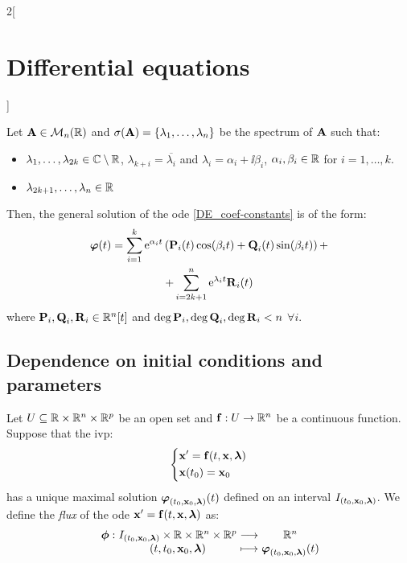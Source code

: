 \documentclass[../../../main.tex]{subfiles}
\begin{document}
\begin{multicols}{2}[\section{Differential equations}]
\begin{corollary}
    Let $\boldsymbol{\mathrm{A}}\in\mathcal{M}_n(\mathbb{R})$ and $\sigma(\boldsymbol{\mathrm{A}})=\{\lambda_1,\ldots,\lambda_n\}$ be the spectrum of $\boldsymbol{\mathrm{A}}$ such that:
    \begin{itemize}
      \item $\lambda_1,\ldots,\lambda_{2k}\in\mathbb{C}\setminus\mathbb{R}$, $\lambda_{k+i}=\overline{\lambda_i}$ and $\lambda_i=\alpha_i+\ii\beta_i$, $\alpha_i,\beta_i\in\mathbb{R}$ for $i=1,\ldots,k$.
      \item $\lambda_{2k+1},\ldots,\lambda_n\in\mathbb{R}$
    \end{itemize}
    Then, the general solution of the ode \eqref{DE_coef-constants} is of the form:
    \begin{multline*}
      \boldsymbol{\mathrm{\varphi}}(t)=\sum_{i=1}^k\mathrm{e}^{\alpha_i t}\left(\boldsymbol{\mathrm{P}}_i(t)\cos(\beta_i t)+\boldsymbol{\mathrm{Q}}_i(t)\sin(\beta_i t)\right)+\\+\sum_{i=2k+1}^n\mathrm{e}^{\lambda_i t}\boldsymbol{\mathrm{R}}_i(t)
    \end{multline*}
    where $\boldsymbol{\mathrm{P}}_i,\boldsymbol{\mathrm{Q}}_i,\boldsymbol{\mathrm{R}}_i\in\mathbb{R}^n[t]$ and $\deg \boldsymbol{\mathrm{P}}_i,\deg\boldsymbol{\mathrm{Q}}_i,\deg\boldsymbol{\mathrm{R}}_i<n$ $\forall i$.
  \end{corollary}
  \subsection{Dependence on initial conditions and parameters}
  \begin{definition}
    Let $U\subseteq\mathbb{R}\times\mathbb{R}^n\times\mathbb{R}^p$ be an open set and $\boldsymbol{\mathrm{f}}:U\rightarrow\mathbb{R}^n$ be a continuous function. Suppose that the ivp:
    \begin{equation}\label{DE_ivp_lambda}
      \left\{
      \begin{aligned}
         & \boldsymbol{\mathrm{x}}'      =\boldsymbol{\mathrm{f}}(t,\boldsymbol{\mathrm{x}},\boldsymbol{\mathrm{\lambda}}) \\
         & \boldsymbol{\mathrm{x}}(t_0)  =\boldsymbol{\mathrm{x}}_0
      \end{aligned}
      \right.
    \end{equation}
    has a unique maximal solution $\boldsymbol{\mathrm{\varphi}}_{(t_0,\boldsymbol{\mathrm{x}}_0,\boldsymbol{\mathrm{\lambda}})}(t)$ defined on an interval $I_{(t_0,\boldsymbol{\mathrm{x}}_0,\boldsymbol{\mathrm{\lambda}})}$. We define the \textit{flux} of the ode $\boldsymbol{\mathrm{x}}'=\boldsymbol{\mathrm{f}}(t,\boldsymbol{\mathrm{x}},\boldsymbol{\mathrm{\lambda}})$ as: $$\function{\vectorfunction{\phi}}{I_{(t_0,\vectorfunction{x}_0,\vectorfunction{\lambda})}\times\RR\times\RR^n\times\RR^p}{\RR^n}{(t,t_0,\vectorfunction{x}_0,\vectorfunction{\lambda})}{\vectorfunction{\varphi}_{(t_0,\vectorfunction{x}_0,\vectorfunction{\lambda})}(t)}$$
  \end{definition}

\end{multicols}
\end{document}
